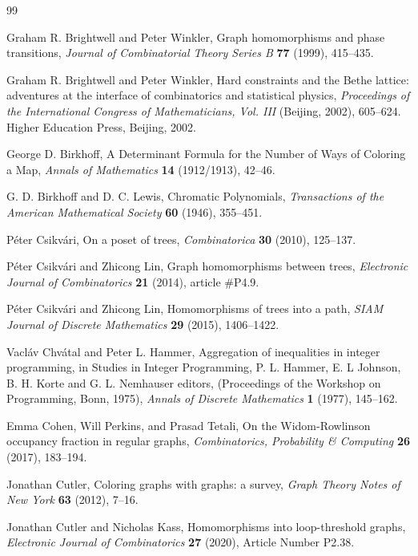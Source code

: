 \documentclass[11pt]{article}
\theoremstyle{definition}
\begin{document}
\begin{thebibliography}{99}

Graham R. Brightwell and Peter Winkler, Graph homomorphisms and phase transitions, {\it Journal of Combinatorial Theory Series B} {\bf 77} (1999), 415--435.

Graham R. Brightwell and Peter Winkler, Hard constraints and the Bethe lattice: adventures at the interface of combinatorics and statistical physics, {\it Proceedings of the International Congress of Mathematicians, Vol. III} (Beijing, 2002), 605--624. Higher Education Press, Beijing, 2002.

George D. Birkhoff, A Determinant Formula for the Number of Ways of Coloring a Map, {\it Annals of Mathematics} {\bf 14} (1912/1913), 42--46.

G. D. Birkhoff and D. C. Lewis, Chromatic Polynomials, {\it Transactions of the American Mathematical Society} {\bf 60} (1946), 355--451.

P\'eter Csikv\'ari, On a poset of trees, {\it 
Combinatorica} {\bf 30} (2010), 125--137.

P\'eter Csikv\'ari and Zhicong Lin, Graph homomorphisms between trees,
{\it Electronic Journal of Combinatorics} {\bf 21} (2014), article \#P4.9.

P\'eter Csikv\'ari and Zhicong Lin, Homomorphisms of trees into a path, {\it SIAM Journal of Discrete Mathematics} {\bf 29} (2015), 1406--1422.

Vacl\'av Chv\'atal and Peter L. Hammer, Aggregation of inequalities in integer programming, in Studies in Integer Programming, P. L. Hammer, E. L Johnson, B. H. Korte and G. L. Nemhauser editors,   (Proceedings of the Workshop on Programming, Bonn, 1975), {\it Annals of Discrete Mathematics} {\bf 1} (1977), 145--162.

Emma Cohen, Will Perkins, and Prasad Tetali, On the Widom-Rowlinson occupancy fraction in regular graphs, {\it Combinatorics, Probability \& Computing} {\bf 26} (2017), 183--194.

Jonathan Cutler, Coloring graphs with graphs: a survey, {\it Graph Theory Notes of New York}  {\bf 63} (2012), 7--16.

Jonathan Cutler and Nicholas Kass, Homomorphisms into loop-threshold graphs, {\it Electronic Journal of Combinatorics} {\bf 27} (2020), Article Number P2.38.


\end{thebibliography}
\end{document}
